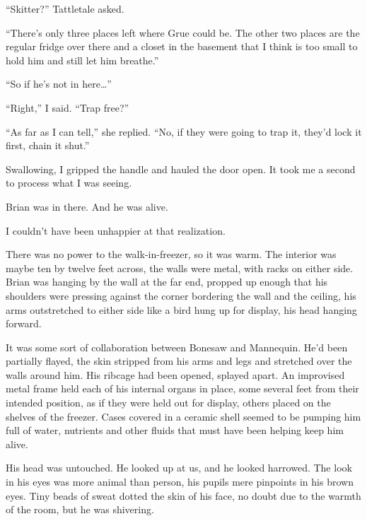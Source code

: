 ``Skitter?''  Tattletale asked.



``There's only three places left where Grue could be.  The other two places are the regular fridge over there and a closet in the basement that I think is too small to hold him and still let him breathe.''



``So if he's not in here\ldots''



``Right,'' I said.  ``Trap free?''



``As far as I can tell,'' she replied.  ``No, if they were going to trap it, they'd lock it first, chain it shut.''



Swallowing, I gripped the handle and hauled the door open.  It took me a second to process what I was seeing.



Brian was in there.  And he was alive.



I couldn't have been unhappier at that realization.



There was no power to the walk-in-freezer, so it was warm.  The interior was maybe ten by twelve feet across, the walls were metal, with racks on either side.  Brian was hanging by the wall at the far end, propped up enough that his shoulders were pressing against the corner bordering the wall and the ceiling, his arms outstretched to either side like a bird hung up for display, his head hanging forward.



It was some sort of collaboration between Bonesaw and Mannequin.  He'd been partially flayed, the skin stripped from his arms and legs and stretched over the walls around him.  His ribcage had been opened, splayed apart.  An improvised metal frame held each of his internal organs in place, some several feet from their intended position, as if they were held out for display, others placed on the shelves of the freezer.  Cases covered in a ceramic shell seemed to be pumping him full of water, nutrients and other fluids that must have been helping keep him alive.



His head was untouched.  He looked up at us, and he looked harrowed.  The look in his eyes was more animal than person, his pupils mere pinpoints in his brown eyes.  Tiny beads of sweat dotted the skin of his face, no doubt due to the warmth of the room, but he was shivering.



